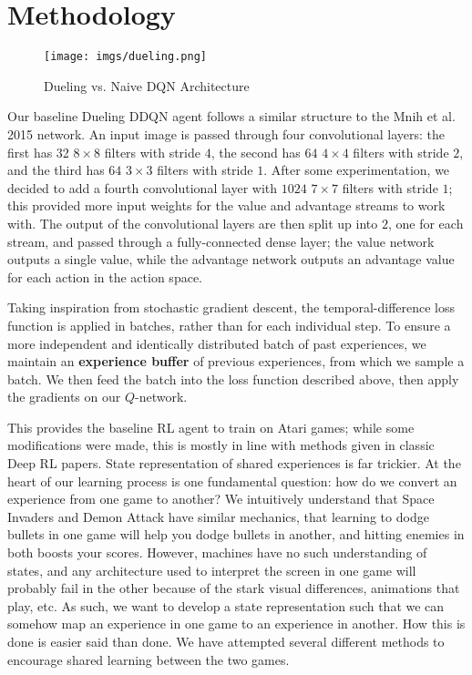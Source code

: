 \documentclass{article} %
\begin{document}
\section{Methodology}

\begin{figure}[htpb]
  \centering
  \texttt{[image: imgs/dueling.png]}
  \caption{Dueling vs. Naive DQN Architecture}
  \label{fig:imgs-dueling-png}
\end{figure}

Our baseline Dueling DDQN agent follows a similar structure to the Mnih et al. 2015 network. An
input image is passed through four convolutional layers: the first has 32 $8\times 8$ filters with
stride $4$, the second has $64$ $4\times 4$ filters with stride $2$, and the third has $64$ $3\times
3$ filters with stride $1$. After some experimentation, we decided to add a fourth convolutional
layer with $1024$ $7\times 7$ filters with stride $1$; this provided more input weights for the
value and advantage streams to work with. The output of the convolutional layers are then split up
into $2$, one for each stream, and passed through a fully-connected dense layer; the value network
outputs a single value, while the advantage network outputs an advantage value for each action in
the action space.

Taking inspiration from stochastic gradient descent, the temporal-difference loss function is
applied in batches, rather than for each individual step. To ensure a more independent and
identically distributed batch of past experiences, we maintain an \textbf{experience buffer} of
previous experiences, from which we sample a batch. We then feed the batch into the loss function
described above, then apply the gradients on our $Q$-network.

This provides the baseline RL agent to train on Atari games; while some modifications were made,
this is mostly in line with methods given in classic Deep RL papers. State representation of shared
experiences is far trickier. At the heart of our learning process is one fundamental question: how
do we convert an experience from one game to another? We intuitively understand that Space Invaders
and Demon Attack have similar mechanics, that learning to dodge bullets in one game will help you
dodge bullets in another, and hitting enemies in both boosts your scores. However, machines have no
such understanding of states, and any architecture used to interpret the screen in one game will
probably fail in the other because of the stark visual differences, animations that play, etc. As
such, we want to develop a state representation such that we can somehow map an experience in one
game to an experience in another. How this is done is easier said than done. We have attempted
several different methods to encourage shared learning between the two games.
\end{document}
